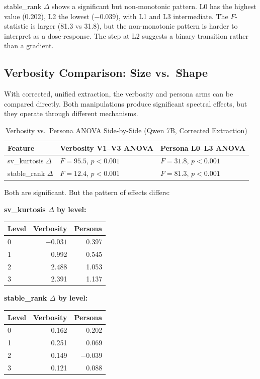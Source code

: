 \documentclass[11pt]{article}
\begin{document}
stable\_rank $\Delta$ shows a significant but non-monotonic pattern. L0 has the highest value (0.202), L2 the lowest ($-0.039$), with L1 and L3 intermediate. The $F$-statistic is larger (81.3 vs 31.8), but the non-monotonic pattern is harder to interpret as a dose-response. The step at L2 suggests a binary transition rather than a gradient.

\subsection{Verbosity Comparison: Size vs.\ Shape}
\label{sec:verbosity-comparison}

With corrected, unified extraction, the verbosity and persona arms can be compared directly. Both manipulations produce significant spectral effects, but they operate through different mechanisms.

\begin{table}[H]
\centering
\caption{Verbosity vs.\ Persona ANOVA Side-by-Side (Qwen 7B, Corrected Extraction)}
\label{tab:verbosity-persona}
\begin{tabular}{lll}
\toprule
Feature & Verbosity V1--V3 ANOVA & Persona L0--L3 ANOVA \\
\midrule
sv\_kurtosis $\Delta$ & $F = 95.5$, $p < 0.001$ & $F = 31.8$, $p < 0.001$ \\
stable\_rank $\Delta$ & $F = 12.4$, $p < 0.001$ & $F = 81.3$, $p < 0.001$ \\
\bottomrule
\end{tabular}
\end{table}

Both are significant. But the pattern of effects differs:

\textbf{sv\_kurtosis $\Delta$ by level:}

\begin{table}[H]
\centering
\begin{tabular}{lrr}
\toprule
Level & Verbosity & Persona \\
\midrule
0 & $-0.031$ & 0.397 \\
1 & 0.992 & 0.545 \\
2 & 2.488 & 1.053 \\
3 & 2.391 & 1.137 \\
\bottomrule
\end{tabular}
\end{table}

\textbf{stable\_rank $\Delta$ by level:}

\begin{table}[H]
\centering
\begin{tabular}{lrr}
\toprule
Level & Verbosity & Persona \\
\midrule
0 & 0.162 & 0.202 \\
1 & 0.251 & 0.069 \\
2 & 0.149 & $-0.039$ \\
3 & 0.121 & 0.088 \\
\bottomrule
\end{tabular}
\end{table}
\end{document}
